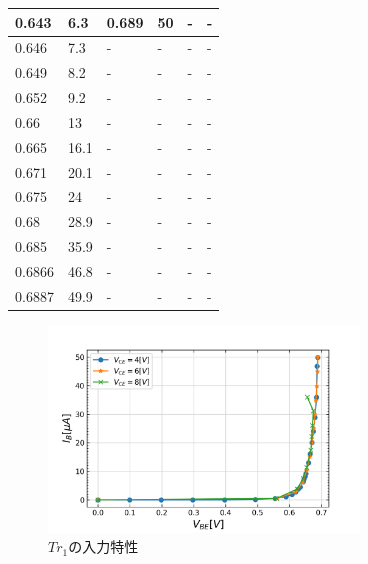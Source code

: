 \documentclass[10pt, a4j, dvipdfmx]{jarticle}
\begin{document}
\begin{table}[H]
\begin{tabular}{|l|l|l|l|l|l|}
        0.643                   & 6.3      & 0.689                   & 50       & -                       & -        \\ \hline
        0.646                   & 7.3      & -                       & -        & -                       & -        \\ \hline
        0.649                   & 8.2      & -                       & -        & -                       & -        \\ \hline
        0.652                   & 9.2      & -                       & -        & -                       & -        \\ \hline
        0.66                    & 13       & -                       & -        & -                       & -        \\ \hline
        0.665                   & 16.1     & -                       & -        & -                       & -        \\ \hline
        0.671                   & 20.1     & -                       & -        & -                       & -        \\ \hline
        0.675                   & 24       & -                       & -        & -                       & -        \\ \hline
        0.68                    & 28.9     & -                       & -        & -                       & -        \\ \hline
        0.685                   & 35.9     & -                       & -        & -                       & -        \\ \hline
        0.6866                  & 46.8     & -                       & -        & -                       & -        \\ \hline
        0.6887                  & 49.9     & -                       & -        & -                       & -        \\ \hline
        \end{tabular}
        \normalsize
    \end{table}
    \begin{figure}[H]
        \centering
        \includegraphics[height=55mm]{ex-1.png}
        \caption{$Tr_1$の入力特性}
        \label{ex:1}    
    \end{figure}
    
\end{document}
